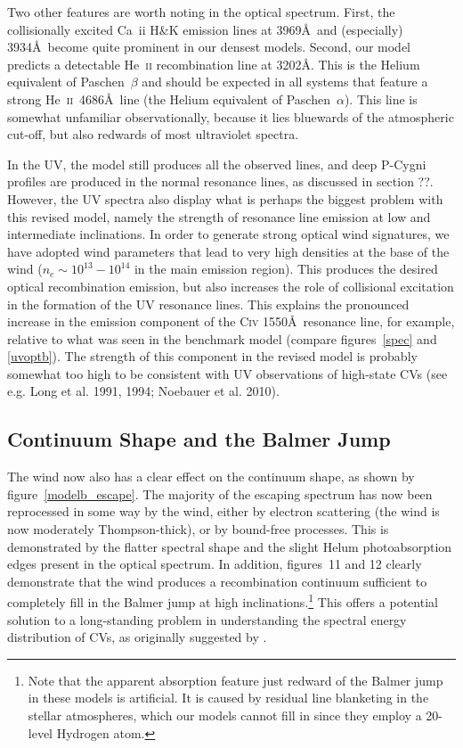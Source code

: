 \documentclass[preprint, a4paper, 11pt]{aastex}
\begin{document}
Two other features are worth noting in the optical
spectrum. First, the collisionally excited Ca~{\sc ii} H\&K 
emission lines at 3969\AA\ and (especially) 3934\AA\ 
become quite prominent in our densest models. Second, our model predicts a detectable
He~\textsc{ii} recombination line at 3202\AA. This is the Helium
equivalent of Paschen~$\beta$ and should be expected in all systems that
feature a strong He~\textsc{ii}~4686\AA\ line (the Helium
equivalent of Paschen~$\alpha$). 
This line is somewhat unfamiliar observationally, because it 
lies bluewards of the atmospheric cut-off, but
also redwards of most ultraviolet spectra. 

In the UV, the model still produces all the observed lines, 
and deep P-Cygni profiles are produced in the normal resonance lines,
as discussed in section ??. However, the UV spectra also
display what is perhaps the biggest problem with this revised model,
namely the strength of resonance line emission 
at low and intermediate inclinations.
In order to generate strong optical wind signatures, we have adopted wind
parameters that lead to very high densities at the base of the wind
($n_e\sim10^{13}-10^{14}$ in the main emission region). This produces
the desired optical recombination emission, but also increases the
role of collisional excitation in the formation of the UV resonance
lines. This explains the pronounced increase in the emission component 
of the C\textsc{iv} 1550\AA\ resonance line, for example, relative to
what was seen in the benchmark model (compare figures~\ref{spec} and
\ref{uvoptb}). The strength of this component in the revised model 
is probably somewhat too high to be consistent with UV observations 
of high-state CVs (see e.g. Long et al. 1991, 1994; Noebauer et al. 2010).
\nocite{long1991,long1994, noebauer}

\subsection{Continuum Shape and the Balmer Jump}

The wind now also has a clear effect on the continuum shape,
as shown by figure~\ref{modelb_escape}. The majority of the
escaping spectrum has now been reprocessed in some way by the wind,
either by electron scattering (the wind is now moderately Thompson-thick),
or by bound-free processes. This is demonstrated by the flatter spectral shape
and the slight Helum photoabsorption edges present in the optical spectrum.
In addition, figures~11 and 12 clearly demonstrate that the wind produces
a recombination continuum sufficient to completely fill in the Balmer jump
at high inclinations.\footnote{Note that the apparent absorption feature 
just redward of the Balmer jump in these models is artificial. It is
caused by residual line blanketing in the stellar atmospheres, which
our models cannot fill in since they employ a 20-level Hydrogen atom.}
This offers a potential solution to a long-standing problem in
understanding the spectral energy distribution of CVs, as
originally suggested by \cite{KLWB98}. 
\end{document}
